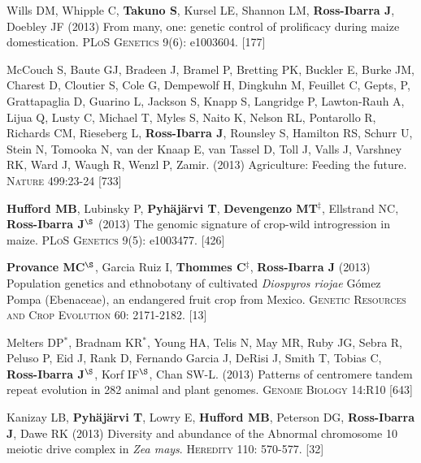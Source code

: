 \documentclass[letterpaper,10pt]{article}
\begin{document}
\begin{etaremune}
\item Wills DM, Whipple C, {\bf Takuno S}, Kursel LE, Shannon LM, {\bf Ross-Ibarra J}, Doebley JF (2013) From many, one: genetic control of prolificacy during maize domestication. \textsc{PLoS Genetics} 9(6): e1003604. %
{} [177]\\

\item McCouch S, Baute GJ, Bradeen J, Bramel P, Bretting PK, Buckler E, Burke JM, Charest D, Cloutier S, Cole G, Dempewolf H, Dingkuhn M, Feuillet C, Gepts, P, Grattapaglia D, Guarino L, Jackson S, Knapp S, Langridge P, Lawton-Rauh A, Lijua Q, Lusty C, Michael T, Myles S, Naito K, Nelson RL, Pontarollo R, Richards CM, Rieseberg L, {\bf Ross-Ibarra J}, Rounsley S, Hamilton RS, Schurr U, Stein N, Tomooka N, van der Knaap E, van Tassel D, Toll J, Valls J, Varshney RK, Ward J, Waugh R, Wenzl P, Zamir. (2013) Agriculture: Feeding the future. \textsc{Nature} 499:23-24
{} [733]\\

\item {\bf Hufford MB}, Lubinsky P, {\bf Pyh\"aj\"arvi T}, {\bf Devengenzo MT}$^\ddagger$, Ellstrand NC, {\bf Ross-Ibarra J}$^\S$ (2013) The genomic signature of crop-wild introgression in maize. \textsc{PLoS Genetics} 9(5): e1003477. %
{} [426]\\


\item {\bf Provance MC}$^\S$, Garcia Ruiz I, {\bf Thommes C}$^\ddagger$, {\bf Ross-Ibarra J} (2013) Population genetics and ethnobotany of cultivated \emph{Diospyros riojae} G\'omez Pompa (Ebenaceae), an endangered fruit crop from Mexico. \textsc{Genetic Resources and Crop Evolution} 60: 2171-2182.
{} [13]\\


\item Melters DP$^*$, Bradnam KR$^*$, Young HA, Telis N, May MR, Ruby JG, Sebra R, Peluso P, Eid J, Rank D, Fernando Garcia J, DeRisi J, Smith T, Tobias C, {\bf Ross-Ibarra J}$^\S$, Korf IF$^\S$, Chan SW-L. (2013) Patterns of centromere tandem repeat evolution in 282 animal and plant genomes. \textsc{Genome Biology} 14:R10
{} [643]\\


\item Kanizay LB, {\bf Pyh\"aj\"arvi T}, Lowry E, {\bf Hufford MB}, Peterson DG, {\bf Ross-Ibarra J}, Dawe RK (2013) Diversity and abundance of the Abnormal chromosome 10 meiotic drive complex in \emph{Zea mays}. \textsc{Heredity} 110: 570-577.
{} [32]\\



\end{etaremune}
\end{document}
